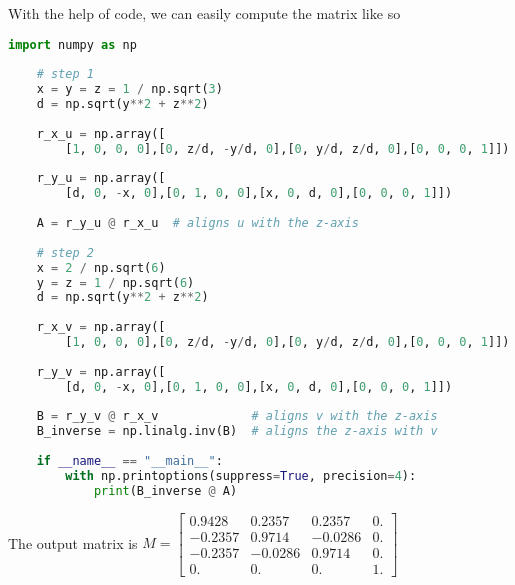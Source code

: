 \documentclass[11pt]{article}  %
\begin{document}
    With the help of code, we can easily compute the matrix like so\\
    \begin{lstlisting}[language=python,numbers=none]
    import numpy as np
    
    # step 1
    x = y = z = 1 / np.sqrt(3)
    d = np.sqrt(y**2 + z**2)
    
    r_x_u = np.array([
        [1, 0, 0, 0],[0, z/d, -y/d, 0],[0, y/d, z/d, 0],[0, 0, 0, 1]])
    
    r_y_u = np.array([
        [d, 0, -x, 0],[0, 1, 0, 0],[x, 0, d, 0],[0, 0, 0, 1]])
    
    A = r_y_u @ r_x_u  # aligns u with the z-axis
    
    # step 2
    x = 2 / np.sqrt(6)
    y = z = 1 / np.sqrt(6)
    d = np.sqrt(y**2 + z**2)
    
    r_x_v = np.array([
        [1, 0, 0, 0],[0, z/d, -y/d, 0],[0, y/d, z/d, 0],[0, 0, 0, 1]])
    
    r_y_v = np.array([
        [d, 0, -x, 0],[0, 1, 0, 0],[x, 0, d, 0],[0, 0, 0, 1]])
    
    B = r_y_v @ r_x_v             # aligns v with the z-axis
    B_inverse = np.linalg.inv(B)  # aligns the z-axis with v
    
    if __name__ == "__main__":
        with np.printoptions(suppress=True, precision=4):
            print(B_inverse @ A)
    \end{lstlisting}
    
    The output matrix is
    $M = \begin{bmatrix}
    0.9428 &  0.2357 &  0.2357 &  0.\\
    -0.2357 &  0.9714 & -0.0286 &  0.\\
    -0.2357 & -0.0286 &  0.9714 &  0.\\
    0.     &  0.     &  0.     &  1.
    \end{bmatrix}$\\
\end{document}
